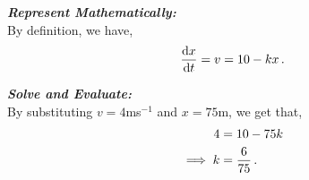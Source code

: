 \begin{subquestions}
\begin{subsubquestions}
\textbf{\textit{Represent Mathematically:}} \\
By definition, we have,
\begin{equation}
	\frac{\mathrm{d}x}{\mathrm{d}t}=v = 10-kx \,.
\end{equation}




\textbf{\textit{Solve and Evaluate:}} \\
By substituting $v=4$ms$^{-1}$ and $x=75$m, we get that,
\begin{align}
	4 & = 10-75k \nonumber \\
	\implies k & = \frac{6}{75} \,.
\end{align}

\end{subsubquestions}

\end{subquestions}